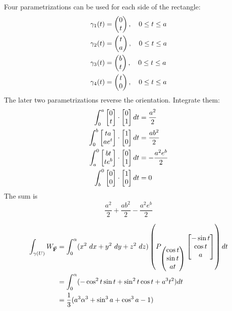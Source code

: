 \documentclass{homework}
\begin{document}
\begin{problem}{9}
  Four parametrizations can be used for each side of the rectangle:
  \begin{align*}
    \gamma_1(t) &= \begin{pmatrix}0 \\ t\end{pmatrix},\quad 0 \leq t \leq a \\
    \gamma_2(t) &= \begin{pmatrix}t \\ a\end{pmatrix},\quad 0 \leq t \leq a \\
    \gamma_3(t) &= \begin{pmatrix}b \\ t\end{pmatrix},\quad 0 \leq t \leq a \\
    \gamma_4(t) &= \begin{pmatrix}t \\ 0\end{pmatrix},\quad 0 \leq t \leq a \\
  \end{align*}
  The later two parametrizations reverse the orientation.
  Integrate them:
  \begin{align*}
    \int_0^a \begin{bmatrix}0 \\ t\end{bmatrix} \cdot \begin{bmatrix}0 \\ 1\end{bmatrix} dt     &= \dfrac{a^2}{2} \\
    \int_0^b \begin{bmatrix}ta \\ ae^t\end{bmatrix} \cdot \begin{bmatrix}1 \\ 0\end{bmatrix} dt &= \dfrac{ab^2}{2} \\
    \int_a^0 \begin{bmatrix}bt \\ te^b\end{bmatrix} \cdot \begin{bmatrix}0 \\ 1\end{bmatrix} dt &= -\dfrac{a^2e^b}{2} \\
    \int_b^0 \begin{bmatrix}0 \\ 0\end{bmatrix} \cdot \begin{bmatrix}1 \\ 0\end{bmatrix} dt     &= 0 \\
  \end{align*}
  The sum is
  $$\dfrac{a^2}{2} + \dfrac{ab^2}{2} - \dfrac{a^2e^b}{2}$$
\end{problem}

\begin{problem}{10}
  \begin{align*}
    \int_{\gamma(U)} W_{\vec{\mathbf{F}}} &=
    \int_0^\alpha
      (x^2\ dx + y^2\ dy + z^2\ dz) \left(
        P_{\begin{pmatrix}\cos t \\ \sin t \\ at\end{pmatrix}}
          \begin{bmatrix}-\sin t \\ \cos t \\ a\end{bmatrix}
      \right) dt \\ &=
    \int_0^\alpha (- \cos^2 t\sin t
                   + \sin^2 t\cos t
                   + a^3 t^2) dt \\ &=
    \dfrac{1}{3} (a^3\alpha^3 + \sin^3 a + \cos^3 a - 1)
  \end{align*}
\end{problem}
\end{document}
